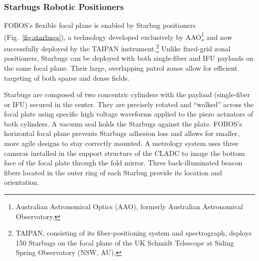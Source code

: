 \documentclass[oneside,11pt]{amsart}
\newcommand{\arcsec}{\mbox{$^{\prime\prime}$}}
\begin{document}

\subsubsection{Starbugs Robotic Positioners}
\label{sec:starbugs}


FOBOS's flexible focal plane is enabled by Starbug positioners (Fig.~\ref{fig:starbugs}), a technology developed exclusively by AAO\footnote{Australian Astronomical Optics (AAO), formerly Australian Astronomical Observatory.} and now successfully deployed by the TAIPAN instrument.\footnote{TAIPAN, consisting of its fiber-positioning system and spectrograph, deploys 150 Starbugs on the focal plane of the UK Schmidt Telescope at Siding Spring Observatory (NSW, AU).}  Unlike fixed-grid zonal positioners, Starbugs can be deployed with both single-fiber and IFU payloads on the same focal plane.  Their large, overlapping patrol zones allow for efficient targeting of both sparse and dense fields.  

Starbugs are composed of two concentric cylinders with the payload (single-fiber or IFU) secured in the center. They are precisely rotated and ``walked'' across the focal plate using specific high voltage waveforms applied to the piezo actuators of both cylinders. A vacuum seal holds the Starbugs against the plate. FOBOS's horizontal focal plane prevents Starbugs adhesion loss and allows for smaller, more agile designs to stay correctly mounted. A metrology system uses three cameras installed in the support structure of the CLADC to image the bottom face of the focal plate through the fold mirror. Three back-illuminated beacon fibers located in the outer ring of each Starbug provide its location and orientation.

\end{document}

